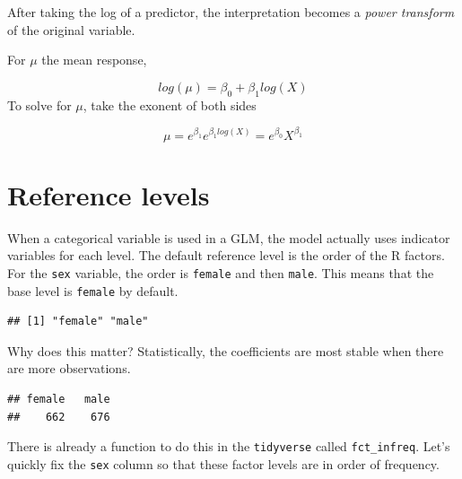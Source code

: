 \documentclass[
  openany]{book}
\newenvironment{Shaded}{\begin{snugshade}}{\end{snugshade}}
\newcommand{\KeywordTok}[1]{\textcolor[rgb]{0.13,0.29,0.53}{\textbf{#1}}}
\newcommand{\NormalTok}[1]{#1}
\newcommand{\OperatorTok}[1]{\textcolor[rgb]{0.81,0.36,0.00}{\textbf{#1}}}
\newcommand{\StringTok}[1]{\textcolor[rgb]{0.31,0.60,0.02}{#1}}
\begin{document}
After taking the log of a predictor, the interpretation becomes a \emph{power transform} of the original variable.

For \(\mu\) the mean response,

\[log(\mu) = \beta_0 + \beta_1 log(X)\]
To solve for \(\mu\), take the exonent of both sides

\[\mu = e^{\beta_1} e^{\beta_1 log(X)} = e^{\beta_0} X^{\beta_1}\]

\hypertarget{reference-levels}{%
\section{Reference levels}\label{reference-levels}}

When a categorical variable is used in a GLM, the model actually uses indicator variables for each level. The default reference level is the order of the R factors. For the \texttt{sex} variable, the order is \texttt{female} and then \texttt{male}. This means that the base level is \texttt{female} by default.

\begin{Shaded}
\end{Shaded}

\begin{verbatim}
## [1] "female" "male"
\end{verbatim}

Why does this matter? Statistically, the coefficients are most stable when there are more observations.

\begin{Shaded}
\end{Shaded}

\begin{verbatim}
## female   male 
##    662    676
\end{verbatim}

There is already a function to do this in the \texttt{tidyverse} called \texttt{fct\_infreq}. Let's quickly fix the \texttt{sex} column so that these factor levels are in order of frequency.
\end{document}
